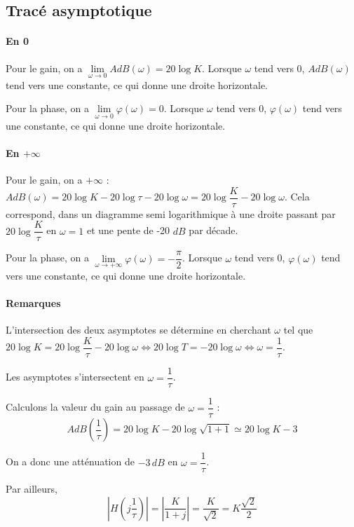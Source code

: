 \documentclass[10pt,oneside]{article}
\begin{document}
\subsection{Tracé asymptotique}
\paragraph*{En 0}
Pour le gain, on a $\underset{\omega \to 0 }{\lim} AdB(\omega) = 20 \log K$. Lorsque $\omega$ tend vers 0, $AdB(\omega)$ tend vers une constante, ce qui donne une droite horizontale.

Pour la phase, on a $\underset{\omega \to 0 }{\lim} \varphi(\omega) = 0$. Lorsque $\omega$ tend vers 0, $\varphi(\omega)$ tend vers une constante, ce qui donne une droite horizontale.

\paragraph*{En $+\infty$}
Pour le gain, on a $+\infty $ : $AdB(\omega) = 20 \log K -20\log \tau-20\log \omega = 20 \log \dfrac{K}{\tau} -20\log \omega$. Cela correspond, dans un diagramme semi logarithmique à une droite passant par $20 \log \dfrac{K}{\tau}$ en $\omega=1$ et une pente de -20 $dB$ par décade. 

Pour la phase, on a $\underset{\omega \to +\infty }{\lim} \varphi(\omega) = -\dfrac{\pi}{2}$. Lorsque $\omega$ tend vers 0, $\varphi(\omega)$ tend vers une constante, ce qui donne une droite horizontale.

\paragraph*{Remarques}
L'intersection des deux asymptotes se détermine en cherchant $\omega$ tel que  $ 20 \log K = 20 \log \dfrac{K}{\tau} -20\log \omega \Longleftrightarrow 
20 \log T = -20\log \omega \Longleftrightarrow  \omega = \dfrac{1}{\tau}$.

\begin{resultat}
Les asymptotes s'intersectent en $\omega = \dfrac{1}{\tau}$.
\end{resultat}

Calculons la valeur du gain au passage de $\omega = \dfrac{1}{\tau}$ :
$$
AdB\left(\dfrac{1}{\tau}\right) 
= 20\log K - 20 \log \sqrt{ 1+1} \simeq 20\log K - 3 
$$

On a donc une atténuation de $-3\,dB$ en $\omega = \dfrac{1}{\tau}$.

Par ailleurs, 
$$
\left|H\left(j\dfrac{1}{\tau}\right)\right| = \left|\dfrac{K}{1+j}\right| = \dfrac{K}{\sqrt{2}} = K\dfrac{\sqrt{2}}{2}
$$
\end{document}
